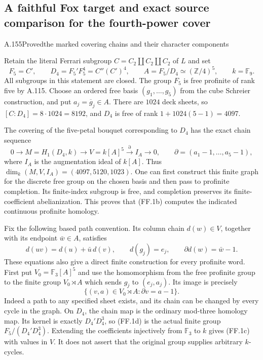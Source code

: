 \subsection{A faithful Fox target and exact source comparison for the fourth-power cover}


\begin{statement}{A.155}{Proved}{the marked covering chains and their character components}
\end{statement}
Retain the literal Ferrari subgroup $C=C_2\amalg C_2\amalg C_2$
of $L$ and set
\[
 F_5=C',\qquad D_4=F_5'F_5^4=C''(C')^4,\qquad
 A=F_5/D_4\simeq(\mathbb Z/4)^5,\qquad k=\mathbb F_9.
 \tag{FF.1a}
\]
All subgroups in this statement are closed. The group $F_5$ is free
profinite of rank five by A.115. Choose an ordered free basis
$(g_1,\ldots,g_5)$ from the cube Schreier construction, and put
$a_j=\overline g_j\in A$. There are $1024$ deck sheets, so
$[C:D_4]=8\cdot1024=8192$, and $D_4$ is free of rank
$1+1024(5-1)=4097$.

The covering of the five-petal bouquet corresponding to $D_4$
has the exact chain sequence
\[
 0\longrightarrow M=H_1(D_4,k)
 \longrightarrow V=k[A]^5
 \stackrel{\partial}{\longrightarrow}I_A
 \longrightarrow0,\qquad
 \partial=(a_1-1,\ldots,a_5-1),
 \tag{FF.1b}
\]
where $I_A$ is the augmentation ideal of $k[A]$. Thus
$\dim_k(M,V,I_A)=(4097,5120,1023)$.
One can first construct this finite graph for the discrete free
group on the chosen basis and then pass to profinite completion.
Its finite-index subgroup is free, and completion preserves its
finite-coefficient abelianization. This proves that (FF.1b)
computes the indicated continuous profinite homology.

Fix the following based path convention. Its column chain
$d(w)\in V$, together with its endpoint $\bar w\in A$, satisfies
\[
 d(uv)=d(u)+\bar u\,d(v),\qquad
 d(g_j)=e_j,\qquad \partial d(w)=\bar w-1.
 \tag{FF.1c}
\]
These equations also give a direct finite construction for every
profinite word. First put $V_0=\mathbb F_3[A]^5$ and use the
homomorphism from the free profinite group to the finite group
$V_0\rtimes A$ which sends $g_j$ to $(e_j,a_j)$.
Its image is precisely
\[
 \{(v,a)\in V_0\rtimes A:\partial v=a-1\}.
 \tag{FF.1d}
\]
Indeed a path to any specified sheet exists, and its chain can
be changed by every cycle in the graph. On $D_4$, the chain
map is the ordinary mod-three homology map. Its kernel is
exactly $D_4'D_4^3$, so (FF.1d) is the actual finite group
$F_5/(D_4'D_4^3)$. Extending the coefficients injectively from
$\mathbb F_3$ to $k$ gives (FF.1c) with values in $V$.
It does not assert that the original group supplies arbitrary
$k$-cycles.

